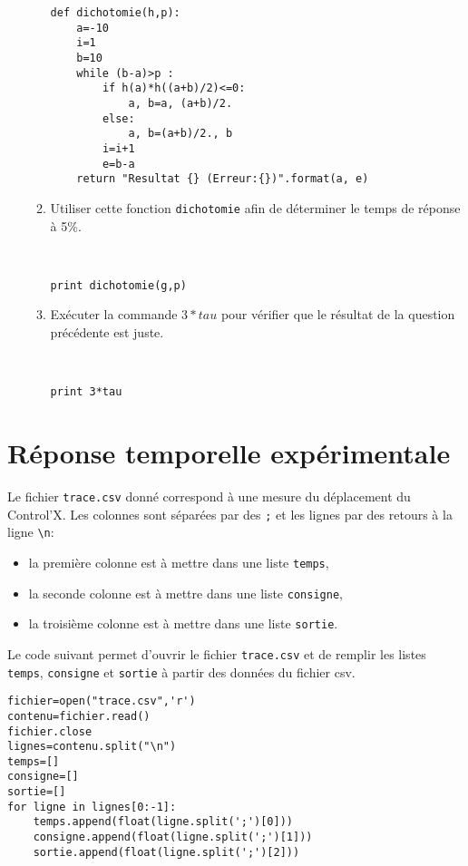 \documentclass[a4paper,12pt]{article}
\begin{document}
\begin{enumerate}
\begin{enumerate}
\begin{solution}
\begin{verbatim}
def dichotomie(h,p):
    a=-10
    i=1
    b=10
    while (b-a)>p :
        if h(a)*h((a+b)/2)<=0:
            a, b=a, (a+b)/2.
        else:
            a, b=(a+b)/2., b
        i=i+1
        e=b-a
    return "Resultat {} (Erreur:{})".format(a, e)
\end{verbatim}
\end{solution}
\item Utiliser cette fonction \verb?dichotomie? afin de déterminer le temps de réponse à 5\%.
\begin{solution}~\ \\
\begin{verbatim}
print dichotomie(g,p)
\end{verbatim}
\end{solution}
\item Exécuter la commande $3*tau$ pour vérifier que le résultat de la question précédente est juste.
\begin{solution}~\ \\
\begin{verbatim}
print 3*tau
\end{verbatim}
\end{solution}
\end{enumerate}
\end{enumerate}

\section*{Réponse temporelle expérimentale}

Le fichier \verb?trace.csv? donné correspond à une mesure du déplacement du Control'X. Les colonnes sont séparées par des \verb?;? et les lignes par des retours à la ligne \verb?\n?:
\begin{itemize}
 \item la première colonne est à mettre dans une liste \verb?temps?,
 \item la seconde colonne est à mettre dans une liste \verb?consigne?,
 \item la troisième colonne est à mettre dans une liste \verb?sortie?.
\end{itemize}

Le code suivant permet d'ouvrir le fichier \verb?trace.csv? et de remplir les listes \verb?temps?, \verb?consigne? et \verb?sortie? à partir des données du fichier csv.

\begin{verbatim}
fichier=open("trace.csv",'r')
contenu=fichier.read()
fichier.close
lignes=contenu.split("\n")
temps=[]
consigne=[]
sortie=[]
for ligne in lignes[0:-1]:
    temps.append(float(ligne.split(';')[0]))
    consigne.append(float(ligne.split(';')[1]))
    sortie.append(float(ligne.split(';')[2]))
\end{verbatim}
\end{document}
